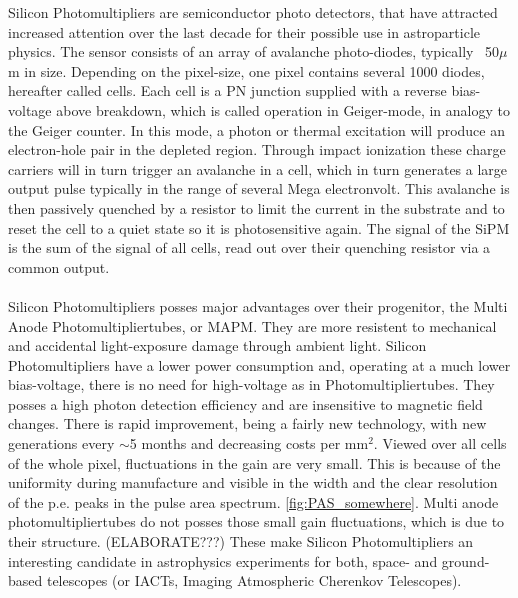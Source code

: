 \documentclass[12pt,article,type=msc,colorback,accentcolor=tud9c]{tudthesis}
\begin{document}
\begin{wrapfigure}{R}{0.5\textwidth}
\centering
\texttt{[image: D:/OwnCloudData/00\_WriteUp/04\_Thesis/Pic/SiPM\_Physics/\{SiPM\_scheme\_HPK.JPG]}}
\caption{\label{fig:SiPM_scheme}SiPM scheme, elaborate later}
\end{wrapfigure}

Silicon Photomultipliers are semiconductor photo detectors, that have attracted increased attention over the last decade for their possible use in astroparticle physics. The sensor consists of an array of avalanche photo-diodes, typically ~50$\mu$m in size. Depending on the pixel-size, one pixel contains several 1000 diodes, hereafter called cells. Each cell is a PN junction supplied with a reverse bias-voltage above breakdown, which is called operation in Geiger-mode, in analogy to the Geiger counter. In this mode, a photon or thermal excitation will produce an electron-hole pair in the depleted region. Through impact ionization these charge carriers will in turn trigger an avalanche in a cell, which in turn generates a large output pulse typically in the range of several Mega electronvolt. This avalanche is then passively quenched by a resistor to limit the current in the substrate and to reset the cell to a quiet state so it is photosensitive again. The signal of the SiPM is the sum of the signal of all cells, read out over their quenching resistor via a common output.\\\\
Silicon Photomultipliers posses major advantages over their progenitor, the Multi Anode Photomultipliertubes, or MAPM. They are more resistent to mechanical and accidental light-exposure damage through ambient light. Silicon Photomultipliers have a lower power consumption and, operating at a much lower bias-voltage, there is no need for high-voltage as in Photomultipliertubes. They posses a high photon detection efficiency and are insensitive to magnetic field changes. There is rapid improvement, being a fairly new technology, with new generations every $\sim$5 months and decreasing costs per mm$^2$. Viewed over all cells of the whole pixel, fluctuations in the gain are very small. This is because of the uniformity during manufacture and visible in the width and the clear resolution of the p.e. peaks in the pulse area spectrum. \ref{fig:PAS_somewhere}. Multi anode photomultipliertubes do not posses those small gain fluctuations, which is due to their structure. (ELABORATE???) These make Silicon Photomultipliers an interesting candidate in astrophysics experiments for both, space- and ground-based telescopes (or IACTs, Imaging Atmospheric Cherenkov Telescopes). 
\end{document}
